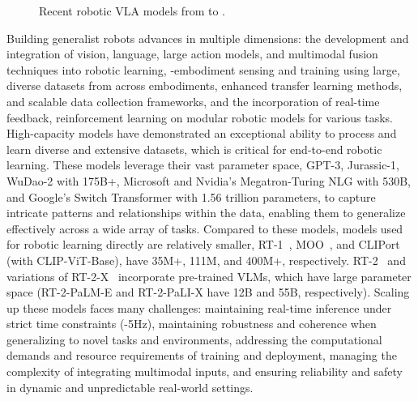 {\begin{figure}
\begin{minipage}{0.6\textwidth}
{
}
\vspace{-4.4ex}
\caption{\small Recent robotic VLA models from {} to {}.}\vspace{-1ex}
\label{fig:vla-timeline}
  \end{minipage}
  \vspace{-2ex}
\end{figure}
Building generalist
robots advances in multiple dimensions: 
 the development and integration of vision, language, large action models, and multimodal fusion techniques into robotic learning, 
 {\xo}-embodiment sensing and training using large, diverse datasets from across embodiments, enhanced transfer learning methods, and scalable data collection frameworks, and
 the incorporation of real-time feedback, reinforcement learning on modular robotic models for various tasks.
High-capacity models have demonstrated an exceptional ability to process and learn diverse and extensive datasets, which is critical for end-to-end robotic learning. 
These models leverage their vast parameter space, \eg GPT-3, Jurassic-1, WuDao-2 with 175B+, Microsoft and Nvidia's Megatron-Turing NLG with 530B, and Google's Switch Transformer with 1.56 trillion parameters, to capture intricate patterns and relationships within the data, enabling them to generalize effectively across a wide array of tasks. 
Compared to these models, models used for robotic learning directly are relatively smaller, \eg RT-1~\cite{rt-1}, MOO~\cite{stone2023open}, and CLIPort~\cite{shridhar2022cliport} (with CLIP-ViT-Base), have 35M+, 111M, and 400M+, respectively. RT-2~\cite{rt-2} and variations of RT-2-X~\cite{9} incorporate pre-trained VLMs, which have large parameter space (\eg RT-2-PaLM-E and RT-2-PaLI-X have 12B and 55B, respectively).
Scaling up these models faces many challenges: 
 maintaining real-time inference under strict time constraints (-5Hz), 
 maintaining robustness and coherence when generalizing to novel tasks and environments, 
 addressing the computational demands and resource requirements of training and deployment, 
 managing the complexity of integrating multimodal inputs, and 
 ensuring reliability and safety in dynamic and unpredictable real-world settings.
}
